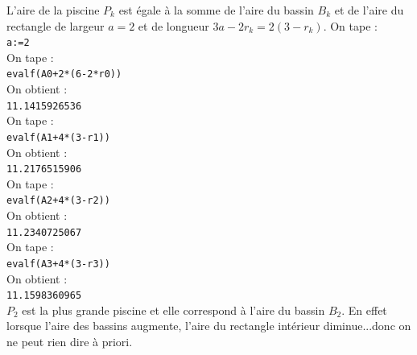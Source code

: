 \documentclass[a4paper,11pt]{book}
\begin{document}
L'aire de la piscine $P_k$ est \'egale \`a la somme de l'aire du bassin $B_k$ 
et de l'aire du rectangle de largeur $a=2$ et de longueur $3a-2r_k=2(3-r_k)$.
On tape :\\
{\tt a:=2}\\
On tape :\\
{\tt evalf(A0+2*(6-2*r0))}\\
On obtient :\\
{\tt 11.1415926536}\\
On tape :\\
{\tt evalf(A1+4*(3-r1))}\\
On obtient :\\
{\tt 11.2176515906}\\
On tape :\\
{\tt evalf(A2+4*(3-r2))}\\
On obtient :\\
{\tt 11.2340725067}\\
On tape :\\
{\tt evalf(A3+4*(3-r3))}\\
On obtient :\\
{\tt 11.1598360965}\\
$P_2$ est la plus grande piscine et elle correspond \`a l'aire du bassin $B_2$.
En effet lorsque l'aire des bassins augmente, l'aire du rectangle int\'erieur
diminue...donc on ne peut rien dire \`a priori.
\end{document}
